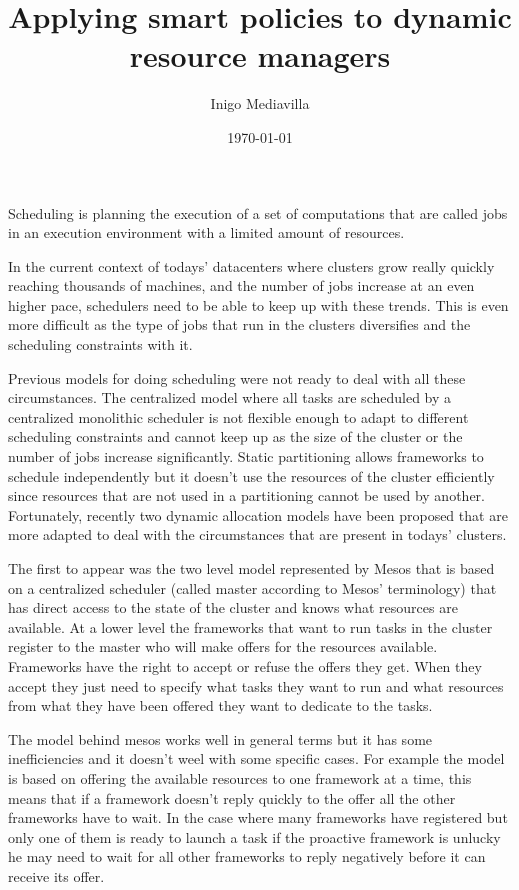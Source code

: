 \documentclass{svjour3}                     %
\begin{document}
\title{ Applying smart policies to dynamic resource managers }


\author{ Inigo Mediavilla }
\date{\today}
\maketitle

Scheduling is planning the execution of a set of computations that are
called jobs in an execution environment with a limited amount of
resources.

In the current context of todays' datacenters where clusters grow
really quickly reaching thousands of machines, and the number of jobs
increase at an even higher pace, schedulers need to be able to keep up with
these trends. This is even more difficult as the type of jobs that run
in the clusters diversifies and the scheduling constraints with it.

Previous models for doing scheduling were not ready to deal with all
these circumstances. The centralized model where all tasks are
scheduled by a centralized monolithic scheduler is not flexible enough
to adapt to different scheduling constraints and cannot keep up as the
size of the cluster or the number of jobs increase
significantly. Static partitioning allows frameworks to schedule
independently but it doesn't use the resources of the cluster
efficiently since resources that are not used in a partitioning cannot
be used by another. Fortunately, recently two dynamic allocation
models have been proposed that are more adapted to deal with the
circumstances that are present in todays' clusters.

The first to appear was the two level model represented by Mesos that
is based on a centralized scheduler (called master according to Mesos'
terminology) that has direct access to the state of the cluster and
knows what resources are available. At a lower level the frameworks
that want to run tasks in the cluster register to the master who will
make offers for the resources available. Frameworks have the right to
accept or refuse the offers they get. When they accept they just need
to specify what tasks they want to run and what resources from what
they have been offered they want to dedicate to the tasks. 

The model behind mesos works well in general terms but it has some
inefficiencies and it doesn't weel with some specific cases. For
example the model is based on offering the available resources to one
framework at a time, this means that if a framework doesn't reply
quickly to the offer all the other frameworks have to wait. In the
case where many frameworks have registered but only one of them is
ready to launch a task if the proactive framework is unlucky he may
need to wait for all other frameworks to reply negatively before it
can receive its offer.
\end{document}
